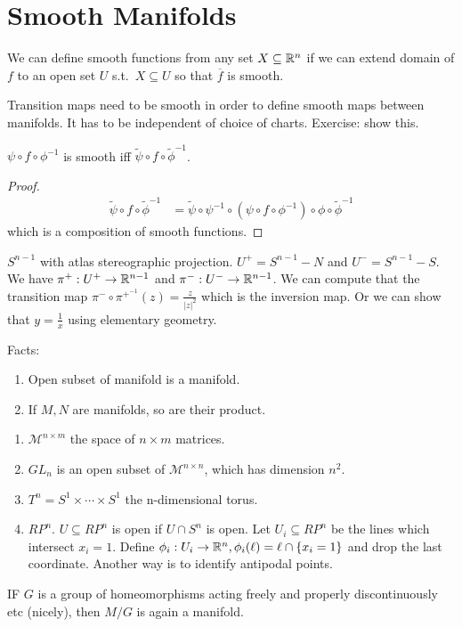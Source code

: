 \documentclass[12pt,class=article,crop=false]{standalone}
\begin{document}
\section{Smooth Manifolds}

We can define smooth functions from any set $ X \subseteq \mathbb{R}^{n}$ if we can extend domain of $ f$ to an open set $ U$  s.t.\ $ X \subseteq U$ so that $ \overline{f}$ is smooth.

Transition maps need to be smooth in order to define smooth maps between manifolds. It has to be independent of choice of charts. Exercise: show this.

\begin{lem}
$ \psi \circ f \circ \phi ^{-1} $ is smooth iff $ \widetilde{ \psi} \circ  f \circ  \widetilde{\phi}^{-1}$.
\end{lem}
\begin{proof}
\begin{align*}
	\widetilde{ \psi} \circ f \circ \widetilde{ \phi} ^{-1} &= \widetilde{ \psi} \circ  \psi ^{-1} \circ (\psi \circ f \circ \phi^{-1}) \circ \phi  \circ \widetilde{ \phi}^{-1}
\end{align*}
which is a composition of smooth functions.
\end{proof}

\begin{eg}
$ S^{n-1}$ with atlas stereographic projection. $ U^{+} = S^{n-1} - N$ and $ U^{-} = S^{n-1} - S$. We have $ \pi^{+}: U^{+} \to \mathbb{R}^{n-1}$ and $ \pi^{-}: U^{-} \to \mathbb{R}^{n-1}$. We can compute that the transition map $ \pi^{-} \circ \pi^{+} ^{-1}(z) = \frac{z}{|z|^{2}}$ which is the inversion map. Or we can show that $ y = \frac{1}{x}$ using elementary geometry.
\end{eg}
Facts:
\begin{enumerate}[label=(\arabic*)]
	\item Open subset of manifold is a manifold.
	\item If $ M,N$ are manifolds, so are their product.
\end{enumerate}
\begin{eg}
\begin{enumerate}[label=(\arabic*)]
	\item $ \mathcal{ M}^{n \times m}$ the space of $ n \times m$ matrices.
	\item $ GL_n$ is an open subset of  $ \mathcal{ M}^{n\times n}$, which has dimension $ n^2$.
	\item $ T^{n}  = S^{1} \times \cdots \times S^{1}$ the n-dimensional torus.
	\item $ RP^{n}$. $ U \subseteq RP^{n}$ is open if $ U \cap S^{n}$ is open. Let $ U_i \subseteq RP^{n}$ be the lines which intersect $ x_i=1$. Define $ \phi_i: U_i \to \mathbb{R}^{n}, \phi_i(\ell)= \ell \cap \{x_i=1\} $ and drop the last coordinate. Another way is to identify antipodal points.
\end{enumerate}

\begin{thm}
IF $ G$ is a group of homeomorphisms acting freely and properly discontinuously etc (nicely), then  $ M /G$ is again a manifold.
\end{thm}
\end{eg}
\end{document}
